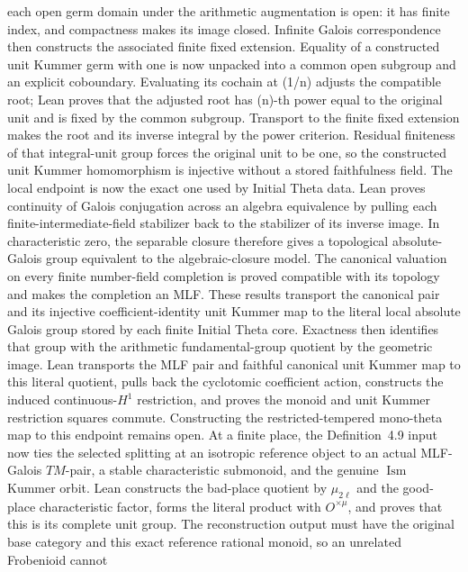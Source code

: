 \begin{definition}
  each open germ domain under the arithmetic augmentation is open: it has
  finite index, and compactness makes its image closed.  Infinite Galois
  correspondence then constructs the associated finite fixed extension.
  Equality of a constructed unit Kummer germ with one is now unpacked into a
  common open subgroup and an explicit coboundary.  Evaluating its cochain at
  (1/n) adjusts the compatible root; Lean proves that the adjusted root has
  (n)-th power equal to the original unit and is fixed by the common
  subgroup.  Transport to the finite fixed extension makes the root and its
  inverse integral by the power criterion.  Residual finiteness of that
  integral-unit group forces the original unit to be one, so the constructed
  unit Kummer homomorphism is injective without a stored faithfulness field.
  The local endpoint is now the exact one used by Initial Theta data.  Lean
  proves continuity of Galois conjugation across an algebra equivalence by
  pulling each finite-intermediate-field stabilizer back to the stabilizer of
  its inverse image.  In characteristic zero, the separable closure therefore
  gives a topological absolute-Galois group equivalent to the algebraic-closure
  model.  The canonical valuation on every finite number-field completion is
  proved compatible with its topology and makes the completion an MLF.  These
  results transport the canonical pair and its injective coefficient-identity
  unit Kummer map to the literal local absolute Galois group stored by each
  finite Initial Theta core.  Exactness then identifies that group with the
  arithmetic fundamental-group quotient by the geometric image.  Lean
  transports the MLF pair and faithful canonical unit Kummer map to this
  literal quotient, pulls back the cyclotomic coefficient action, constructs
  the induced continuous-\(H^1\) restriction, and proves the monoid and unit
  Kummer restriction squares commute.  Constructing the restricted-tempered
  mono-theta map to this endpoint remains open.
  At a finite place, the Definition~4.9 input now ties the selected splitting
  at an isotropic reference object to an actual MLF-Galois \(TM\)-pair, a
  stable characteristic submonoid, and the genuine \(\operatorname{Ism}\)
  Kummer orbit.  Lean constructs the bad-place quotient by
  \(\mu_{2\ell}\) and the good-place characteristic factor, forms the literal
  product with \(O^{\times\mu}\), and proves that this is its complete unit
  group.  The reconstruction output must have the original base category and
  this exact reference rational monoid, so an unrelated Frobenioid cannot

\end{definition}
